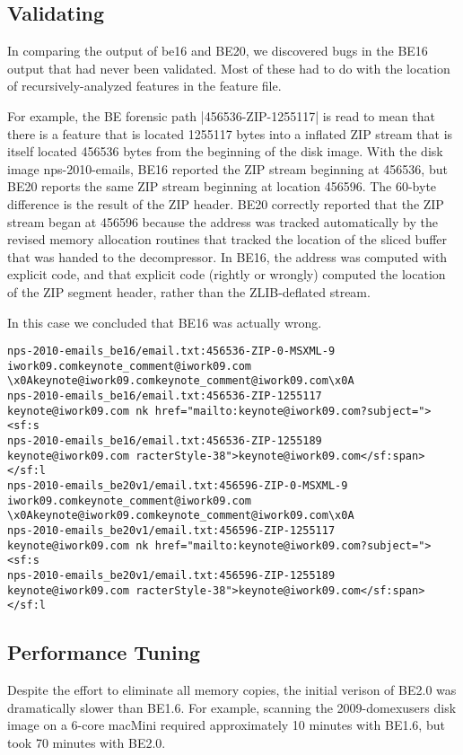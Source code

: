 \documentclass[5p]{elsarticle}
\begin{document}
\subsection{Validating}

In comparing the output of be16 and BE20, we discovered bugs in the
BE16 output that had never been validated. Most of these had to do
with the location of recursively-analyzed features in the feature
file.

For example, the BE forensic path |456536-ZIP-1255117| is read to mean
that there is a feature that is located 1255117 bytes into a
inflated ZIP stream that is itself located 456536 bytes from the
beginning of the disk image. With the disk image nps-2010-emails, BE16
reported the ZIP stream beginning at 456536, but BE20 reports the same
ZIP stream beginning at location 456596. The 60-byte difference is the
result of the ZIP header. BE20 correctly reported that the ZIP stream
began at 456596 because the address was tracked automatically by the
revised memory allocation routines that tracked the location of the
sliced buffer that was handed to the decompressor. In BE16, the
address was computed with explicit code, and that explicit code
(rightly or wrongly) computed the location of the ZIP segment header,
rather than the ZLIB-deflated stream.

In this case we concluded that BE16 was actually wrong.

\begin{figure*}
\begin{Verbatim}
nps-2010-emails_be16/email.txt:456536-ZIP-0-MSXML-9	iwork09.comkeynote_comment@iwork09.com	\x0Akeynote@iwork09.comkeynote_comment@iwork09.com\x0A
nps-2010-emails_be16/email.txt:456536-ZIP-1255117	keynote@iwork09.com	nk href="mailto:keynote@iwork09.com?subject="><sf:s
nps-2010-emails_be16/email.txt:456536-ZIP-1255189	keynote@iwork09.com	racterStyle-38">keynote@iwork09.com</sf:span></sf:l
nps-2010-emails_be20v1/email.txt:456596-ZIP-0-MSXML-9	iwork09.comkeynote_comment@iwork09.com	\x0Akeynote@iwork09.comkeynote_comment@iwork09.com\x0A
nps-2010-emails_be20v1/email.txt:456596-ZIP-1255117	keynote@iwork09.com	nk href="mailto:keynote@iwork09.com?subject="><sf:s
nps-2010-emails_be20v1/email.txt:456596-ZIP-1255189	keynote@iwork09.com	racterStyle-38">keynote@iwork09.com</sf:span></sf:l
\end{Verbatim}
\end{figure*}

\subsection{Performance Tuning}
Despite the effort to eliminate all memory copies, the initial verison
of BE2.0 was dramatically slower than BE1.6. For example, scanning the
2009-domexusers disk image on a 6-core macMini required approximately 10 minutes
with BE1.6, but took 70 minutes with BE2.0.
\end{document}
